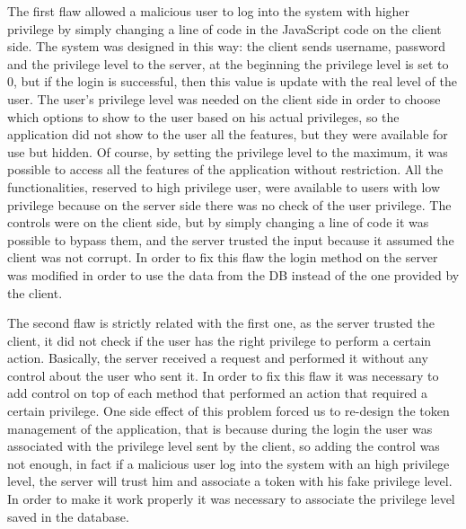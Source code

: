 The first flaw allowed a malicious user to log into the system with higher privilege by simply changing a line of code in the JavaScript code on the client side.\newline
The system was designed in this way: the client sends username, password and the privilege level to the server, at the beginning the privilege level is set to 0, but if the login is successful, then this value is update with the real level of the user.\newline
The user’s privilege level was needed on the client side in order to choose which options to show to the user based on his actual privileges, so the application did not show to the user all the features, but they were available for use but hidden.\newline
Of course, by setting the privilege level to the maximum, it was possible to access all the features of the application without restriction.\newline
All the functionalities, reserved to high privilege user, were available to users with low privilege because on the server side there was no check of the user privilege.\newline
The controls were on the client side, but by simply changing a line of code it was possible to bypass them, and the server trusted the input because it assumed the client was not corrupt.\newline
In order to fix this flaw the login method on the server was modified in order to use the data from the DB instead of the one provided by the client.\newline

The second flaw is strictly related with the first one, as the server trusted the client, it did not check if the user has the right privilege to perform a certain action.\newline
Basically, the server received a request and performed it without any control about the user who sent it.\newline
In order to fix this flaw it was necessary to add control on top of each method that performed an action that required a certain privilege.\newline
One side effect of this problem forced us to re-design the token management of the application, that is because during the login the user was associated with the privilege level sent by the client, so adding the control was not enough, in fact if a malicious user log into the system with an high privilege level, the server will trust him and associate a token with his fake privilege level.\newline
In order to make it work properly it was necessary to associate the privilege level saved in the database.\newline

